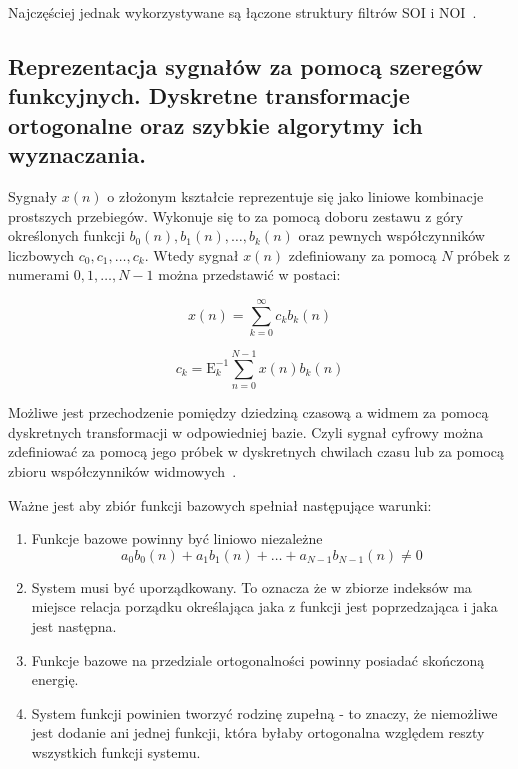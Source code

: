 \documentclass[wi]{zut}
\begin{document}
Najczęściej jednak wykorzystywane są łączone struktury filtrów SOI i NOI~\cite{Cariow_7}.

\subsection{Reprezentacja sygnałów za pomocą szeregów funkcyjnych. Dyskretne transformacje ortogonalne oraz szybkie algorytmy ich wyznaczania.}

Sygnały $x(n)$ o złożonym kształcie reprezentuje się jako liniowe kombinacje prostszych przebiegów. Wykonuje się to za pomocą doboru zestawu z góry określonych funkcji $b_0(n), b_1(n), \ldots, b_k(n)$ oraz pewnych współczynników liczbowych $c_0, c_1, \ldots, c_k$. Wtedy sygnał $x(n)$ zdefiniowany za pomocą $N$ próbek z numerami $0, 1, \ldots, N-1$ można przedstawić w postaci:

\begin{equation}
    x(n)=\sum_{k=0}^{\infty} c_{k} b_{k}(n)
\end{equation}

\begin{equation}
    c_{k}=\mathrm{E}_{k}^{-1} \sum_{n=0}^{N-1} x(n) b_{k}(n)
\end{equation}

Możliwe jest przechodzenie pomiędzy dziedziną czasową a widmem za pomocą dyskretnych transformacji w odpowiedniej bazie. Czyli sygnał cyfrowy można zdefiniować za pomocą jego próbek w dyskretnych chwilach czasu lub za pomocą zbioru współczynników widmowych~\cite{Cariow_6}.

Ważne jest aby zbiór funkcji bazowych spełniał następujące warunki:

\begin{enumerate}
    \item Funkcje bazowe powinny być liniowo niezależne
    $$a_{0} b_{0}(n)+a_{1} b_{1}(n)+\ldots+a_{N-1} b_{N-1}(n) \neq 0$$
    \item System musi być uporządkowany. To oznacza że w zbiorze indeksów ma miejsce relacja porządku określająca jaka z funkcji jest poprzedzająca i jaka jest następna.
    \item Funkcje bazowe na przedziale ortogonalności powinny posiadać skończoną energię.
    \item System funkcji powinien tworzyć rodzinę zupełną - to znaczy, że niemożliwe jest dodanie ani jednej funkcji, która byłaby ortogonalna względem reszty wszystkich funkcji systemu.
\end{enumerate}
\end{document}
